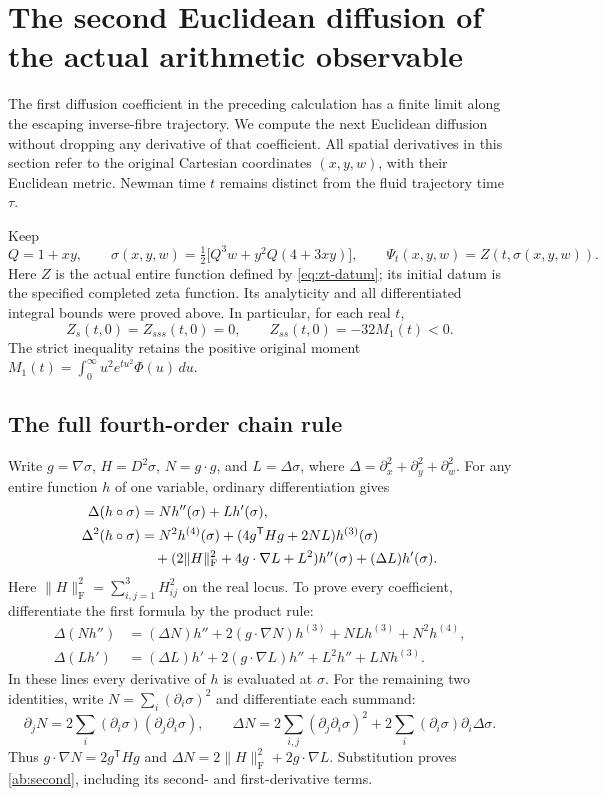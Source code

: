 \section{The second Euclidean diffusion of the actual arithmetic observable}
\label{sec:ab-bilaplacian}

The first diffusion coefficient in the preceding calculation has a finite
limit along the escaping inverse-fibre trajectory. We compute the next
Euclidean diffusion without dropping any derivative of that coefficient.
All spatial derivatives in this section refer to the original Cartesian
coordinates $(x,y,w)$, with their Euclidean metric. Newman time $t$ remains
distinct from the fluid trajectory time $\tau$.

Keep
\[
 Q=1+xy,\qquad
 \sigma(x,y,w)=\tfrac12\bigl[Q^3w+y^2Q(4+3xy)\bigr],
 \qquad \Psi_t(x,y,w)=Z(t,\sigma(x,y,w)).
\]
Here $Z$ is the actual entire function defined by
\eqref{eq:zt-datum}; its initial datum is the specified completed zeta
function. Its analyticity and all differentiated integral bounds were
proved above. In particular, for each real $t$,
\[
 Z_s(t,0)=Z_{sss}(t,0)=0,\qquad
 Z_{ss}(t,0)=-32M_1(t)<0.
\]
The strict inequality retains the positive original moment
$M_1(t)=\int_0^\infty u^2e^{tu^2}\Phi(u)\,du$.

\subsection{The full fourth-order chain rule}

Write $g=\nabla\sigma$, $H=D^2\sigma$, $N=g\cdot g$, and
$L=\Delta\sigma$, where $\Delta=\partial_x^2+\partial_y^2+\partial_w^2$.
For any entire function $h$ of one variable, ordinary differentiation gives
\begin{align}
 \Delta(h\circ\sigma)&=Nh''(\sigma)+Lh'(\sigma),\label{ab:first}\\
 \Delta^2(h\circ\sigma)&=
 N^2h^{(4)}(\sigma)
 +(4g^{\mathsf T}Hg+2NL)h^{(3)}(\sigma)\notag\\
 &\quad+
 (2\lVert H\rVert_{\mathrm F}^2+4g\cdot\nabla L+L^2)h''(\sigma)
 +(\Delta L)h'(\sigma).\label{ab:second}
\end{align}
Here $\lVert H\rVert_{\mathrm F}^2=\sum_{i,j=1}^3H_{ij}^2$ on the
real locus. To prove every coefficient, differentiate the first formula
by the product rule:
\begin{align*}
 \Delta(Nh'')&=(\Delta N)h''
     +2(g\cdot\nabla N)h^{(3)}+NLh^{(3)}+N^2h^{(4)},\\
 \Delta(Lh')&=(\Delta L)h'
     +2(g\cdot\nabla L)h''+L^2h''+LNh^{(3)}.
\end{align*}
In these lines every derivative of $h$ is evaluated at $\sigma$.
For the remaining two identities, write
$N=\sum_i(\partial_i\sigma)^2$ and differentiate each summand:
\[
 \partial_jN=2\sum_i(\partial_i\sigma)(\partial_j\partial_i\sigma),
 \qquad
 \Delta N=2\sum_{i,j}(\partial_j\partial_i\sigma)^2
             +2\sum_i(\partial_i\sigma)\partial_i\Delta\sigma.
\]
Thus $g\cdot\nabla N=2g^{\mathsf T}Hg$ and
$\Delta N=2\lVert H\rVert_{\mathrm F}^2+2g\cdot\nabla L$.
Substitution proves \eqref{ab:second}, including its second- and
first-derivative terms.

